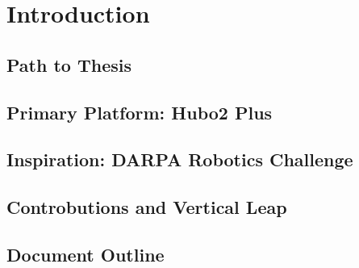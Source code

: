 \chapter{Introduction}
	


	\section{Path to Thesis}\label{sec:roadmap}	
		

	\section{Primary Platform: Hubo2 Plus}\label{sec:hubo}
			




	\section{Inspiration: DARPA Robotics Challenge}\label{sec:drc}
    		

    	\section{Controbutions and Vertical Leap}
		


	
	\section{Document Outline} 
	
